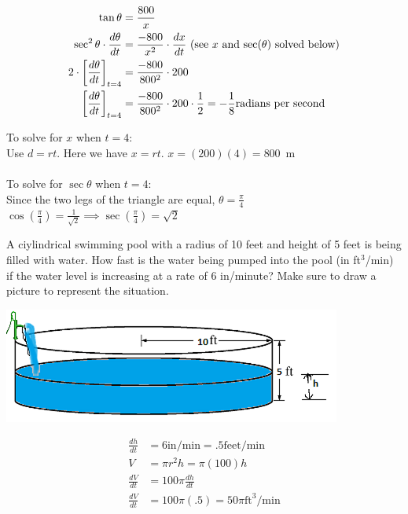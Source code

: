 \documentclass[nooutcomes]{ximera}
\begin{document}
\begin{problem}
\begin{freeResponse}
	\begin{align*}
	\tan {\theta}&=\frac{800}{x}\\
	\sec^2{\theta} \cdot \frac{d\theta}{dt}&=\frac{-800}{x^2}\cdot \frac{dx}{dt}\ \text{(see $x$ and $\sec(\theta)$ solved below)}\\
	2 \cdot \bigg[ \frac{d\theta}{dt} \bigg]_{t=4}&=\frac{-800}{800^2}\cdot 200  \\
	\bigg[ \frac{d\theta}{dt} \bigg]_{t=4}&=\frac{-800}{800^2}\cdot 200 \cdot \frac{1}{2}=-\frac{1}{8} \text{radians per second}
	\end{align*}

To solve for $x$ when $t=4$:\\
Use $d=rt$.  Here we have $x=rt$.  $x=(200)(4)=800$\ m  \\\\

To solve for $\sec{\theta}$ when $t=4$:\\
Since the two legs of the triangle are equal, $\theta=\frac{\pi}{4}$\\
$\cos\left({\frac{\pi}{4}}\right)=\frac{1}{\sqrt{2}} \implies \sec\left({\frac{\pi}{4}}\right)=\sqrt{2}$





\end{freeResponse}
\end{problem}

\begin{problem}
A ciylindrical swimming pool with a radius of 10 feet and height of 5 feet is being filled with water.  How fast is the water being pumped into the pool (in ft$^3$/min) if the water level is increasing at a rate of 6 in/minute?  Make sure to draw a picture to represent the situation.
\begin{freeResponse} \hfil
	\begin{image}
	\includegraphics[scale=.7]{Figure18.png}
	\end{image}
	
	
	\begin{align*}
	\frac{dh}{dt}&=6 \text{in/min}=.5 \text{feet/min}\\
	V&=\pi r^2h=\pi(100)h \\
	\frac{dV}{dt}&=100\pi \frac{dh}{dt}\\
	\frac{dV}{dt}&=100 \pi (.5)=50 \pi \text{ft}^3\text{/min}
	\end{align*}


\end{freeResponse}
	
	
\end{problem}
\end{document}
